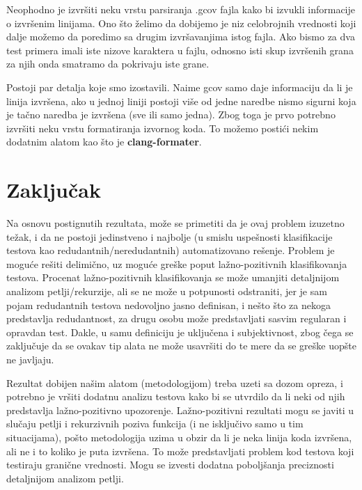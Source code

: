 \documentclass[a4paper]{article}
\begin{document}
Neophodno je izvršiti neku vrstu parsiranja .gcov fajla kako bi izvukli informacije o izvršenim linijama. Ono što želimo da dobijemo je niz celobrojnih vrednosti koji dalje možemo da poredimo sa drugim izvršavanjima istog fajla. Ako bismo za dva test primera imali iste nizove karaktera u fajlu, odnosno isti skup izvršenih grana za njih onda smatramo da pokrivaju iste grane. 

Postoji par detalja koje smo izostavili. Naime gcov samo daje informaciju da li je linija izvršena, ako u jednoj liniji postoji više od jedne naredbe nismo sigurni koja je tačno naredba je izvršena (sve ili samo jedna). Zbog toga je prvo potrebno izvršiti neku vrstu formatiranja izvornog koda. To možemo postići nekim dodatnim alatom kao što je \textbf{clang-formater}.

\section{Zaključak}
\label{sec:zakljucak}
Na osnovu postignutih rezultata, može se primetiti da je ovaj problem izuzetno težak, i da ne postoji jedinstveno i najbolje (u smislu uspešnosti klasifikacije testova kao redudantnih/neredudantnih) automatizovano rešenje. Problem je moguće rešiti delimično, uz moguće greške poput lažno-pozitivnih klasifikovanja testova. Procenat lažno-pozitivnih klasifikovanja se može umanjiti detaljnijom analizom petlji/rekurzije, ali se ne može u potpunosti odstraniti, jer je sam pojam redudantnih testova nedovoljno jasno definisan, i nešto što za nekoga predstavlja redudantnost, za drugu osobu može predstavljati sasvim regularan i opravdan test. Dakle, u samu definiciju je uključena i subjektivnost, zbog čega se zaključuje da se ovakav tip alata ne može usavršiti do te mere da se greške uopšte ne javljaju.

Rezultat dobijen našim alatom (metodologijom) treba uzeti sa dozom opreza, i potrebno je vršiti dodatnu analizu testova kako bi se utvrdilo da li neki od njih predstavlja lažno-pozitivno upozorenje. Lažno-pozitivni rezultati mogu se javiti u slučaju petlji i rekurzivnih poziva funkcija (i ne isključivo samo u tim situacijama), pošto metodologija uzima u obzir da li je neka linija koda izvršena, ali ne i to koliko je puta izvršena. To može predstavljati problem kod testova koji testiraju granične vrednosti. Mogu se izvesti dodatna poboljšanja preciznosti detaljnijom analizom petlji.

\appendix
 

\end{document}
